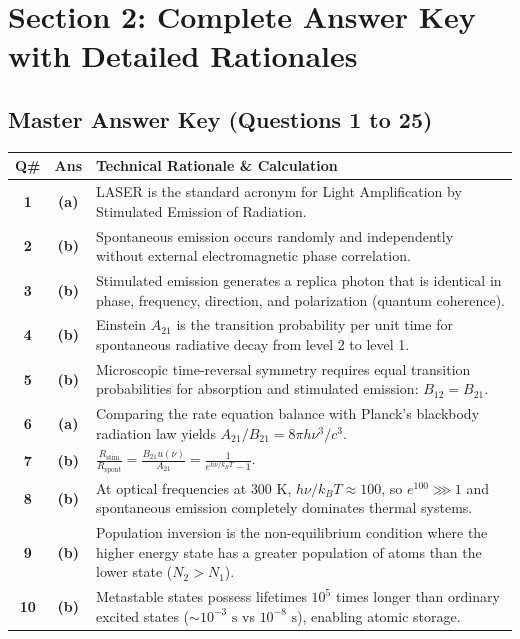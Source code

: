 \newpage
\section{Section 2: Complete Answer Key with Detailed Rationales}

\subsection*{Master Answer Key (Questions 1 to 25)}

{\small
\noindent\begin{tabularx}{\textwidth}{|c|c|X|}
\hline
\textbf{Q\#} & \textbf{Ans} & \textbf{Technical Rationale \& Calculation} \\
\hline
\textbf{1} & \textbf{(a)} & LASER is the standard acronym for Light Amplification by Stimulated Emission of Radiation. \\ \hline
\textbf{2} & \textbf{(b)} & Spontaneous emission occurs randomly and independently without external electromagnetic phase correlation. \\ \hline
\textbf{3} & \textbf{(b)} & Stimulated emission generates a replica photon that is identical in phase, frequency, direction, and polarization (quantum coherence). \\ \hline
\textbf{4} & \textbf{(b)} & Einstein $A_{21}$ is the transition probability per unit time for spontaneous radiative decay from level 2 to level 1. \\ \hline
\textbf{5} & \textbf{(b)} & Microscopic time-reversal symmetry requires equal transition probabilities for absorption and stimulated emission: $B_{12} = B_{21}$. \\ \hline
\textbf{6} & \textbf{(a)} & Comparing the rate equation balance with Planck's blackbody radiation law yields $A_{21}/B_{21} = 8\pi h \nu^3 / c^3$. \\ \hline
\textbf{7} & \textbf{(b)} & $\frac{R_{\text{stim}}}{R_{\text{spont}}} = \frac{B_{21} u(\nu)}{A_{21}} = \frac{1}{e^{h\nu/k_BT} - 1}$. \\ \hline
\textbf{8} & \textbf{(b)} & At optical frequencies at $300\text{ K}$, $h\nu/k_BT \approx 100$, so $e^{100} \ggg 1$ and spontaneous emission completely dominates thermal systems. \\ \hline
\textbf{9} & \textbf{(b)} & Population inversion is the non-equilibrium condition where the higher energy state has a greater population of atoms than the lower state ($N_2 > N_1$). \\ \hline
\textbf{10} & \textbf{(b)} & Metastable states possess lifetimes $10^5$ times longer than ordinary excited states ($\sim 10^{-3}\text{ s}$ vs $10^{-8}\text{ s}$), enabling atomic storage. \\ \hline

\end{tabularx}}
